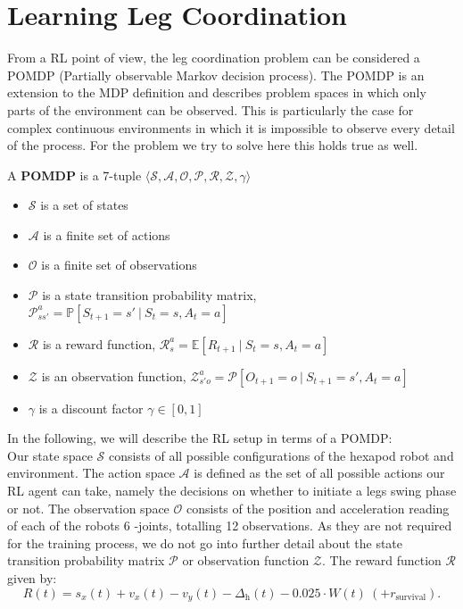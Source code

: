 \section{Learning Leg Coordination} \label{sec: RL setup}
From a RL point of view, the leg coordination problem can be considered a POMDP (Partially observable Markov decision process).
The POMDP is an extension to the MDP definition and describes problem spaces in which only parts of the environment can be observed.
This is particularly the case for complex continuous environments in which it is impossible to observe every detail of the process.
For the problem we try to solve here this holds true as well.

\begin{definition}
	A \textbf{POMDP} is a 7-tuple $\langle \mathcal{S,A,O,P,R,Z,\gamma} \rangle$
	\begin{itemize}
		\item $\mathcal{S}$ is a set of states
		\item $\mathcal{A}$ is a finite set of actions
		\item $\mathcal{O}$ is a finite set of observations
		\item $\mathcal{P}$ is a state transition probability matrix, $\mathcal{P}_{ss'}^a = \mathbb{P}[S_{t+1} = s' \ | \ S_t = s, A_t = a	] $
		\item $\mathcal{R}$ is a reward function, $\mathcal{R}_s^a = \mathbb{E}[R_{t+1} \ | \ S_t = s, A_t = a]$
		\item $\mathcal{Z}$ is an observation function, $\mathcal{Z}_{s'o}^a = \mathcal{P}[O_{t+1} = o \ | \ S_{t+1} = s', A_t = a]$
		\item $\mathcal{\gamma}$ is a discount factor $\mathcal{\gamma} \in [0,1]$
	\end{itemize}
\end{definition}

In the following, we will describe the RL setup in terms of a POMDP:\\
Our state space $\mathcal{S}$ consists of all possible configurations of the hexapod robot and environment.
The action space $\mathcal{A}$ is defined as the set of all possible actions our RL agent can take, namely the decisions on whether to initiate a legs swing phase or not.
The observation space $\mathcal{O}$ consists of the position and acceleration reading of each of the robots 6 \textalpha-joints, totalling 12 observations.
As they are not required for the training process, we do not go into further detail about the state transition probability matrix $\mathcal{P}$ or observation function $\mathcal{Z}$.
The reward function $\mathcal{R}$ given by:
 \[
 R(t) = s_x(t) + v_x(t) - v_y(t) - \Delta_\text{h}(t) - 0.025 \cdot W(t) \ (+ r_\text{survival}).
 \]
 
